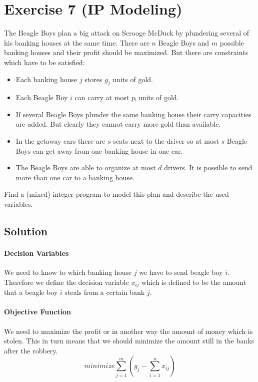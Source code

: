 \documentclass[a4paper, 12pt]{report}
\begin{document}
\section{Exercise 7 (IP Modeling)}

The Beagle Boys plan a big attack on Scrooge McDuck by plundering several of
his banking houses at the same time. There are $n$ Beagle Boys and $m$ possible
banking houses and their profit should be maximized. But there are constraints
which have to be satisfied:

\begin{itemize}
    \item Each banking house $j$ stores $g_j$ units of gold.
    \item Each Beagle Boy $i$ can carry at most $pᵢ$ units of gold.
    \item If several Beagle Boys plunder the same banking house their carry
          capacities are added. But clearly they cannot carry more gold than
          available.
    \item In the getaway cars there are $s$ seats next to the driver so at most
          $s$ Beagle Boys can get away from one banking house in one car.
    \item The Beagle Boys are able to organize at most $d$ drivers. It is
          possible to send more than one car to a banking house.
\end{itemize}

Find a (mixed) integer program to model this plan and describe the used
variables.

\subsection{Solution}

\paragraph{Decision Variables}

We need to know to which banking house $j$ we have to send beagle boy $i$.
Therefore we define the decision variable $x_{ij}$ which is defined to be the
amount that a beagle boy $i$ steals from a certain bank $j$.

\paragraph{Objective Function}

We need to maximize the profit or in another way the amount of money which is
stolen. This in turn means that we should minimize the amount still in the
banks after the robbery.
\[
    minimize ∑_{j=1}^{m} \left( g_j - ∑_{i=1}^{n} x_{ij} \right)
\]
\end{document}
